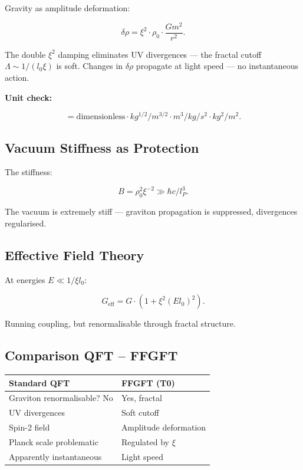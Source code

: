 	Gravity as amplitude deformation:
	
	\begin{equation}
		\delta \rho = \xi^2 \cdot \rho_0 \cdot \frac{G m^2}{r^2}.
	\end{equation}
	
	The double \(\xi^2\) damping eliminates UV divergences — the fractal cutoff \(\Lambda \sim 1/(l_0 \xi)\) is soft. Changes in \(\delta \rho\) propagate at light speed — no instantaneous action.
	
	\textbf{Unit check:}
	
	\begin{equation}
		[\delta \rho] = \text{dimensionless} \cdot \si{kg^{1/2}/m^{3/2}} \cdot \si{m^{3}/kg/s^{2}} \cdot \si{kg^{2}} / \si{m^{2}}.
	\end{equation}
	
	\subsection*{Vacuum Stiffness as Protection}
	
	The stiffness:
	
	\begin{equation}
		B = \rho_0^2 \xi^{-2} \gg \hbar c / l_P^3.
	\end{equation}
	
	The vacuum is extremely stiff — graviton propagation is suppressed, divergences regularised.
	
	\subsection*{Effective Field Theory}
	
	At energies \(E \ll 1/\xi l_0\):
	
	\begin{equation}
		G_{\text{eff}} = G \cdot (1 + \xi^2 (E l_0)^2).
	\end{equation}
	
	Running coupling, but renormalisable through fractal structure.
	
	\subsection*{Comparison QFT – FFGFT}
	
	\begin{center}
		\begin{tabular}{p{}p{}}
			\textbf{Standard QFT} & \textbf{FFGFT (T0)} \\
			\hline
			Graviton renormalisable? No & Yes, fractal \\
			UV divergences & Soft cutoff \\
			Spin-2 field & Amplitude deformation \\
			Planck scale problematic & Regulated by \(\xi\) \\
			Apparently instantaneous & Light speed \\
		\end{tabular}
	\end{center}
	
